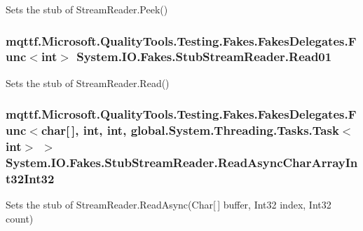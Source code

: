 Sets the stub of Stream\-Reader.\-Peek()

\hypertarget{class_system_1_1_i_o_1_1_fakes_1_1_stub_stream_reader_aa6682b3c662e64a81118422427d6e9f1}{
\subsubsection[{Read01}]{\setlength{\rightskip}{0pt plus 5cm}mqttf.\-Microsoft.\-Quality\-Tools.\-Testing.\-Fakes.\-Fakes\-Delegates.\-Func$<$int$>$ System.\-I\-O.\-Fakes.\-Stub\-Stream\-Reader.\-Read01}}\label{class_system_1_1_i_o_1_1_fakes_1_1_stub_stream_reader_aa6682b3c662e64a81118422427d6e9f1}


Sets the stub of Stream\-Reader.\-Read()

\hypertarget{class_system_1_1_i_o_1_1_fakes_1_1_stub_stream_reader_a3f8fe202bc0946fc7990e6c33441e034}{
\subsubsection[{Read\-Async\-Char\-Array\-Int32\-Int32}]{\setlength{\rightskip}{0pt plus 5cm}mqttf.\-Microsoft.\-Quality\-Tools.\-Testing.\-Fakes.\-Fakes\-Delegates.\-Func$<$char\mbox{[}$\,$\mbox{]}, int, int, global.\-System.\-Threading.\-Tasks.\-Task$<$int$>$ $>$ System.\-I\-O.\-Fakes.\-Stub\-Stream\-Reader.\-Read\-Async\-Char\-Array\-Int32\-Int32}}\label{class_system_1_1_i_o_1_1_fakes_1_1_stub_stream_reader_a3f8fe202bc0946fc7990e6c33441e034}


Sets the stub of Stream\-Reader.\-Read\-Async(\-Char\mbox{[}$\,$\mbox{]} buffer, Int32 index, Int32 count)

